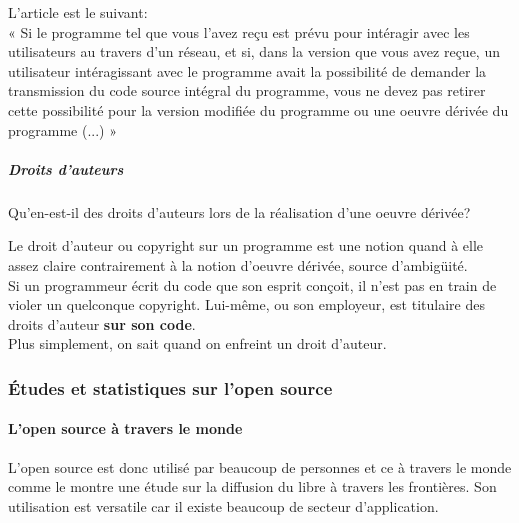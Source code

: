 						L'article est le suivant:\\

						« Si le programme tel que vous l'avez reçu est prévu pour intéragir avec les utilisateurs au travers d'un réseau, et si, dans la version que vous avez reçue, un  utilisateur intéragissant avec le programme avait la possibilité de demander la transmission du code source intégral du programme, vous ne devez pas retirer cette possibilité pour la version modifiée du programme ou une oeuvre dérivée du programme (...) »

					\subparagraph{Droits d'auteurs\\}

						Qu'en-est-il des droits d'auteurs lors de la réalisation d'une oeuvre dérivée?

						Le droit d'auteur ou copyright sur un programme est une notion quand à elle assez claire contrairement à la notion d'oeuvre dérivée, source d'ambigüité.\\

						Si un programmeur écrit du code que son esprit conçoit, il n'est pas en train de violer un quelconque copyright. Lui-même, ou son employeur, est titulaire des droits d'auteur \textbf{sur son code}.\\
						Plus simplement, on sait quand on enfreint un droit d'auteur.

			\subsubsection{Études et statistiques sur l'open source}

				\paragraph{L'open source à travers le monde\\}

					L'open source est donc utilisé par beaucoup de personnes et ce à travers le monde comme le montre une étude sur la diffusion du libre à travers les frontières.
					Son utilisation est versatile car il existe beaucoup de secteur d'application.

